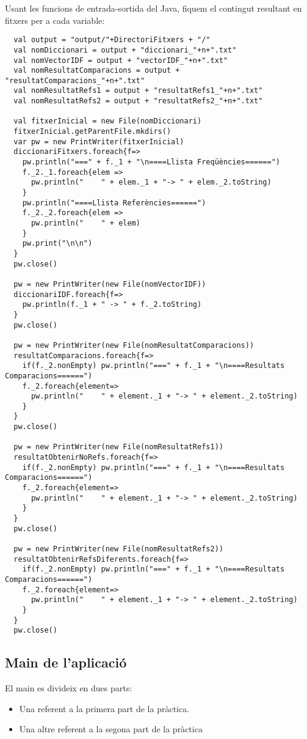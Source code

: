 \documentclass[11pt,a4paper,twoside]{report}
\begin{document}
Usant les funcions de entrada-sortida del Java, fiquem el contingut resultant en fitxers per a cada variable:
\begin{lstlisting}
  val output = "output/"+DirectoriFitxers + "/"
  val nomDiccionari = output + "diccionari_"+n+".txt"
  val nomVectorIDF = output + "vectorIDF_"+n+".txt"
  val nomResultatComparacions = output + "resultatComparacions_"+n+".txt"
  val nomResultatRefs1 = output + "resultatRefs1_"+n+".txt"
  val nomResultatRefs2 = output + "resultatRefs2_"+n+".txt"

  val fitxerInicial = new File(nomDiccionari)
  fitxerInicial.getParentFile.mkdirs()
  var pw = new PrintWriter(fitxerInicial)
  diccionariFitxers.foreach{f=>
    pw.println("===" + f._1 + "\n====Llista Freqüències======")
    f._2._1.foreach{elem =>
      pw.println("    " + elem._1 + "-> " + elem._2.toString)
    }
    pw.println("====Llista Referències======")
    f._2._2.foreach{elem =>
      pw.println("    " + elem)
    }
    pw.print("\n\n")
  }
  pw.close()

  pw = new PrintWriter(new File(nomVectorIDF))
  diccionariIDF.foreach{f=>
    pw.println(f._1 + " -> " + f._2.toString)
  }
  pw.close()

  pw = new PrintWriter(new File(nomResultatComparacions))
  resultatComparacions.foreach{f=>
    if(f._2.nonEmpty) pw.println("===" + f._1 + "\n====Resultats Comparacions======")
    f._2.foreach{element=>
      pw.println("    " + element._1 + "-> " + element._2.toString)
    }
  }
  pw.close()

  pw = new PrintWriter(new File(nomResultatRefs1))
  resultatObtenirNoRefs.foreach{f=>
    if(f._2.nonEmpty) pw.println("===" + f._1 + "\n====Resultats Comparacions======")
    f._2.foreach{element=>
      pw.println("    " + element._1 + "-> " + element._2.toString)
    }
  }
  pw.close()

  pw = new PrintWriter(new File(nomResultatRefs2))
  resultatObtenirRefsDiferents.foreach{f=>
    if(f._2.nonEmpty) pw.println("===" + f._1 + "\n====Resultats Comparacions======")
    f._2.foreach{element=>
      pw.println("    " + element._1 + "-> " + element._2.toString)
    }
  }
  pw.close()
\end{lstlisting}

\subsection{Main de l'aplicació}

El main es divideix en dues parts:
\begin{itemize}
  \item Una referent a la primera part de la pràctica.
  \item Una altre referent a la segona part de la pràctica
\end{itemize}
\end{document}
